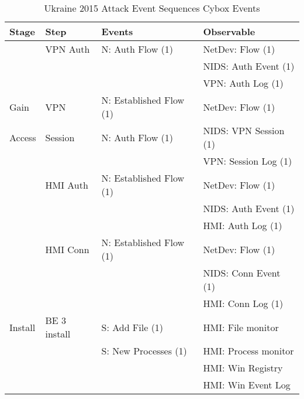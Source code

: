 \documentclass[journal]{IEEEtran}
\begin{document}
\begin{table}
\centering
\caption{Ukraine 2015 Attack Event Sequences \color{red}Cybox Events\color{black}}
\label{tab:ukraine}
\begin{tabular}{| p{1cm} p{1.3cm} ll |}
\rowcolor{Gray}\hline
Stage 			 &  Step  				&  Events                  & Observable \\\hline
                 &  VPN Auth            & N: Auth Flow (1)         & NetDev: Flow (1)   \\
                 &                      &                          & NIDS: Auth Event (1)   \\
                 &                      &                          & VPN: Auth Log (1)  \\\cline{2-4}
                 
Gain             &  VPN 	         	& N: Established Flow (1)  & NetDev: Flow (1)    \\
Access           &  Session             & N: Auth Flow (1)         & NIDS: VPN Session (1)   \\
                 &                      &                          & VPN: Session Log (1)  \\\cline{2-4}   
                 
				 & HMI Auth  			& N: Established Flow (1)  & NetDev: Flow (1)      \\
                 &                      &                          & NIDS: Auth Event (1)   \\
                 &                      &                          & HMI: Auth Log (1)      \\\cline{2-4}
 
				 & HMI Conn  			& N: Established Flow (1)  & NetDev: Flow (1)       \\
                 &                      &                          & NIDS: Conn Event (1)   \\
                 &                      &                          & HMI: Conn Log (1)      \\\hline
           
Install          & BE 3 install         & S: Add File (1)          & HMI: File monitor      \\
                 &                      & S: New Processes (1)     & HMI: Process monitor   \\
                 &                      & 						   & HMI: Win Registry      \\
                 &                      & 						   & HMI: Win Event Log     \\\hline


\end{tabular}
\end{table}
\end{document}
